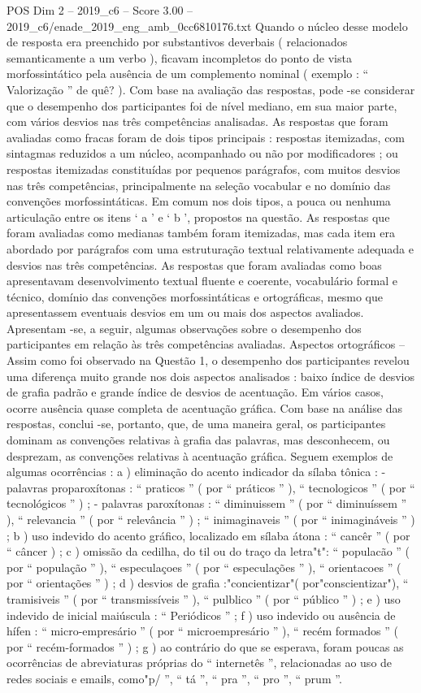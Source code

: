 \begin{textsample}{POS Dim 2 – 2019\_c6 – Score 3.00 – 2019\_c6/enade\_2019\_eng\_amb\_0cc6810176.txt}
Quando o núcleo desse modelo de resposta era preenchido por substantivos deverbais ( relacionados semanticamente a um verbo ), ficavam incompletos do ponto de vista morfossintático pela ausência de um complemento nominal ( exemplo : “ Valorização ” de quê? ).
Com base na avaliação das respostas, pode -se considerar que o desempenho dos participantes foi de nível mediano, em sua maior parte, com vários desvios nas três competências analisadas.
As respostas que foram avaliadas como fracas foram de dois tipos principais : respostas itemizadas, com sintagmas reduzidos a um núcleo, acompanhado ou não por modificadores ; ou respostas itemizadas constituídas por pequenos parágrafos, com muitos desvios nas três competências, principalmente na seleção vocabular e no domínio das convenções morfossintáticas.
Em comum nos dois tipos, a pouca ou nenhuma articulação entre os itens ‘ a ’ e ‘ b ’, propostos na questão.
As respostas que foram avaliadas como medianas também foram itemizadas, mas cada item era abordado por parágrafos com uma estruturação textual relativamente adequada e desvios nas três competências.
As respostas que foram avaliadas como boas apresentavam desenvolvimento textual fluente e coerente, vocabulário formal e técnico, domínio das convenções morfossintáticas e ortográficas, mesmo que apresentassem eventuais desvios em um ou mais dos aspectos avaliados.
Apresentam -se, a seguir, algumas observações sobre o desempenho dos participantes em relação às três competências avaliadas.
Aspectos ortográficos – Assim como foi observado na Questão 1, o desempenho dos participantes revelou uma diferença muito grande nos dois aspectos analisados : baixo índice de desvios de grafia padrão e grande índice de desvios de acentuação.
Em vários casos, ocorre ausência quase completa de acentuação gráfica.
Com base na análise das respostas, conclui -se, portanto, que, de uma maneira geral, os participantes dominam as convenções relativas à grafia das palavras, mas desconhecem, ou desprezam, as convenções relativas à acentuação gráfica.
Seguem exemplos de algumas ocorrências : a ) eliminação do acento indicador da sílaba tônica : - palavras proparoxítonas : “ praticos ” ( por “ práticos ” ), “ tecnologicos ” ( por “ tecnológicos ” ) ; - palavras paroxítonas : “ diminuissem ” ( por “ diminuíssem ” ), “ relevancia ” ( por “ relevância ” ) ; “ inimaginaveis ” ( por “ inimagináveis ” ) ; b ) uso indevido do acento gráfico, localizado em sílaba átona : “ cancêr ” ( por “ câncer ) ; c ) omissão da cedilha, do til ou do traço da letra"t": “ populacão ” ( por “ população ” ), “ especulaçoes ” ( por “ especulações ” ), “ orientacoes ” ( por “ orientações ” ) ; d ) desvios de grafia :"concientizar"( por"conscientizar"), “ tramisiveis ” ( por “ transmissíveis ” ), “ pulblico ” ( por “ público ” ) ; e ) uso indevido de inicial maiúscula : “ Periódicos ” ; f ) uso indevido ou ausência de hífen : “ micro-empresário ” ( por “ microempresário ” ), “ recém formados ” ( por “ recém-formados ” ) ; g ) ao contrário do que se esperava, foram poucas as ocorrências de abreviaturas próprias do “ internetês ”, relacionadas ao uso de redes sociais e emails, como"p/ ”, “ tá ”, “ pra ”, “ pro ”, “ prum ”.

\end{textsample}

